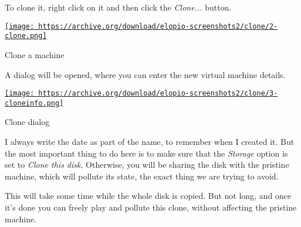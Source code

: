 \documentclass[12pt]{article}
\begin{document}
To clone it, right click on it and then click the \emph{Clone...} button.

\begin{center}
  \href{
    https://archive.org/download/elopio-screenshots2/clone/2-clone.png}{
    \texttt{[image: 
    https://archive.org/download/elopio-screenshots2/clone/2-clone.png]}
  }
  \caption{Clone a machine}
\end{center}

A dialog will be opened, where you can enter the new virtual machine details.

\begin{center}
  \href{
    https://archive.org/download/elopio-screenshots2/clone/3-cloneinfo.png}{
    \texttt{[image: 
    https://archive.org/download/elopio-screenshots2/clone/3-cloneinfo.png]}
  }
  \caption{Clone dialog}
\end{center}

I always write the date as part of the name, to remember when I created it.
But the most important thing to do here is to make sure that the \emph{Storage}
option is set to \emph{Clone this disk}. Otherwise, you will be sharing the disk
with the pristine machine, which will pollute its state, the exact thing we are
trying to avoid.

This will take some time while the whole disk is copied. But not long, and
once it's done you can freely play and pollute this clone, without affecting the
pristine machine.
\end{document}
